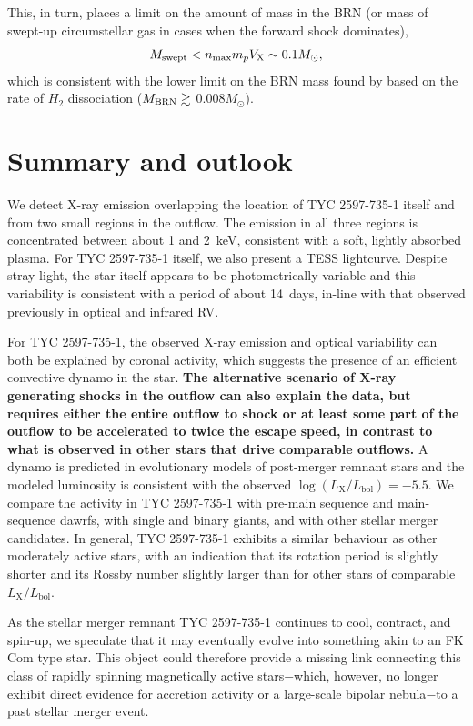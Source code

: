 \documentclass[linenumbers]{aastex631}
\newcommand{\be}{\begin{equation}}
\newcommand{\ee}{\end{equation}}
\begin{document}
This, in turn, places a limit on the amount of mass in the BRN (or mass of swept-up circumstellar gas in cases when the forward shock dominates),
\be
M_{\rm swept} < n_{\rm max} m_p V_{\rm X} \sim 0.1M_{\odot},
\ee
which is consistent with the lower limit on the BRN mass found by \citet{2020Natur.587..387H} based on the rate of $H_2$ dissociation ($M_{\rm BRN} \gtrsim$ 0.008$M_{\odot}$).


\section{Summary and outlook}
\label{sec:summary}
We detect X-ray emission overlapping the location of TYC 2597-735-1 itself and from two small regions in the outflow. The emission in all three regions is concentrated between about 1 and 2~keV, consistent with a soft, lightly absorbed plasma.  For TYC 2597-735-1 itself, we also present a TESS lightcurve. Despite stray light, the star itself appears to be photometrically variable and this variability is consistent with a period of about 14~days, in-line with that observed previously in optical and infrared RV.

For TYC 2597-735-1, the observed X-ray emission and optical variability can both be explained by coronal activity, which suggests the presence of an efficient convective dynamo in the star. \textbf{The alternative scenario of X-ray generating shocks in the outflow can also explain the data, but requires either the entire outflow to shock or at least some part of the outflow to be accelerated to twice the escape speed, in contrast to what is observed in other stars that drive comparable outflows.} A dynamo is predicted in evolutionary models of post-merger remnant stars and the modeled luminosity is consistent with the observed $\log(L_\mathrm{X}/L_\mathrm{bol})=-5.5$.  We compare the activity in TYC 2597-735-1 with pre-main sequence and main-sequence dawrfs, with single and binary giants, and with other stellar merger candidates. In general, TYC 2597-735-1 exhibits a similar behaviour as other moderately active stars, with an indication that its rotation period is slightly shorter and its Rossby number slightly larger than for other stars of comparable $L_\mathrm{X}/L_\mathrm{bol}$.

As the stellar merger remnant TYC 2597-735-1 continues to cool, contract, and spin-up, we speculate that it may eventually evolve into something akin to an FK Com type star.  This object could therefore provide a missing link connecting this class of rapidly spinning magnetically active stars$-$which, however, no longer exhibit direct evidence for accretion activity or a large-scale bipolar nebula$-$to a past stellar merger event.
\end{document}
